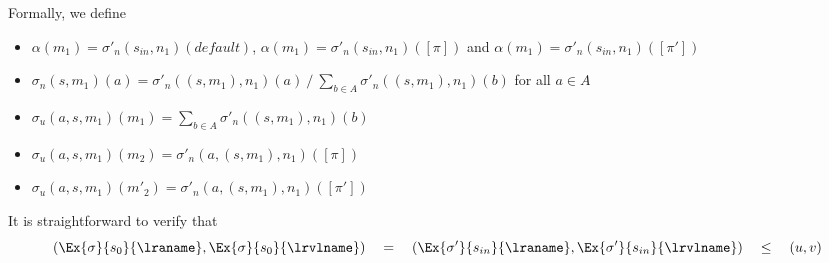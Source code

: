  Formally, we define
\begin{itemize}
\item $\alpha(m_1)=\sigma'_n(s_{in},n_1)(\mathit{default})$, $\alpha(m_1)=\sigma'_n(s_{in},n_1)([\pi])$ and $\alpha(m_1)=\sigma'_n(s_{in},n_1)([\pi'])$
\item $\sigma_n(s,m_1)(a)=\sigma'_n((s,m_1),n_1)(a)\  / \ \sum_{b\in A} \sigma'_n((s,m_1),n_1)(b)$  for all $a\in A$
\item $\sigma_u(a,s,m_1)(m_1)=\sum_{b\in A} \sigma'_n((s,m_1),n_1)(b)$
\item $\sigma_u(a,s,m_1)(m_2)=\sigma'_n(a,(s,m_1),n_1)([\pi])$
\item $\sigma_u(a,s,m_1)(m'_2)=\sigma'_n(a,(s,m_1),n_1)([\pi'])$
\end{itemize}
It is straightforward to verify that 
\[
(\Ex{\sigma}{s_0}{\lraname}, \Ex{\sigma}{s_0}{\lrvlname})\quad = \quad (\Ex{\sigma'}{s_{in}}{\lraname}, \Ex{\sigma'}{s_{in}}{\lrvlname})\quad \leq \quad (u,v)
\]



